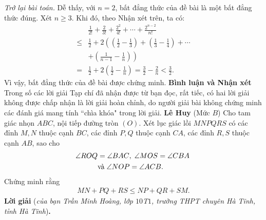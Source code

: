 \begin{multicols}{2}
	\vskip 0.05cm
	\textit{Trở lại bài toán.}
	\vskip 0.05cm
	Dễ thấy, với $n = 2$, bất đẳng thức của đề bài là một bất đẳng thức đúng.
	\vskip 0.05cm
	Xét $n \ge 3$. Khi đó, theo Nhận xét trên, ta có:
	\begin{align*}
		&\frac{1}{{2!}} + \frac{2}{{3!}} + \frac{{{2^2}}}{{4!}} +  \cdots  + \frac{{{2^{n - 2}}}}{{n!}} \\
		\le &\frac{1}{2} + 2\left( \left( {\frac{1}{2} - \frac{1}{3}} \right) + \left( {\frac{1}{3} - \frac{1}{4}} \right) +  \cdots \right. \\
		&\left.+ \left( {\frac{1}{{n - 1}} - \frac{1}{n}} \right) \right)\\
		= &\frac{1}{2} + 2\left( {\frac{1}{2} - \frac{1}{n}} \right) = \frac{3}{2} - \frac{2}{n} < \frac{3}{2}.
	\end{align*}
	Vì vậy, bất đẳng thức của đề bài được chứng minh.
	\vskip 0.05cm
	\columnbreak
	\textbf{\color{thachthuctoanhoc}Bình luận và Nhận xét}
	\vskip 0.05cm
	Trong số các lời giải Tạp chí đã nhận được từ bạn đọc, rất tiếc, có hai lời giải không được chấp nhận là lời giải hoàn chỉnh, do người giải bài không chứng minh các đánh giá mang tính ``chìa khóa" trong lời giải.
	\vskip 0.1cm
	\hfill	\textbf{\color{thachthuctoanhoc}Lê Huy}
	\vskip 0.1cm
	{}
	(Mức $B$) Cho tam giác nhọn $ABC$, nội tiếp đường tròn $(O)$. Xét lục giác lồi $MNPQRS$ có các đỉnh $M, N$ thuộc cạnh $BC$, các đỉnh $P, Q$ thuộc cạnh $CA$, các đỉnh $R, S$ thuộc cạnh $AB$, sao cho
	\begin{align*}
		\angle{ROQ} &=\angle{BAC},\; \angle{MOS} =\angle{CBA}\;\\
		&\text{\color{black}và}\;\angle{NOP }= \angle{ACB}.
	\end{align*}
	Chứng minh rằng 
	\begin{align*}
		MN + PQ + RS \leq NP + QR + SM.
	\end{align*}
	\textbf{\color{thachthuctoanhoc}Lời giải} (\textit{của bạn Trần Minh Hoàng, lớp $10$T$1$, trường THPT chuyên Hà Tĩnh, tỉnh Hà Tĩnh})\textbf{\color{thachthuctoanhoc}.}
	\begin{figure}[H]
		\centering
		\vspace*{-10pt}
		\captionsetup{labelformat= empty, justification=centering}

\end{figure}
\end{multicols}
